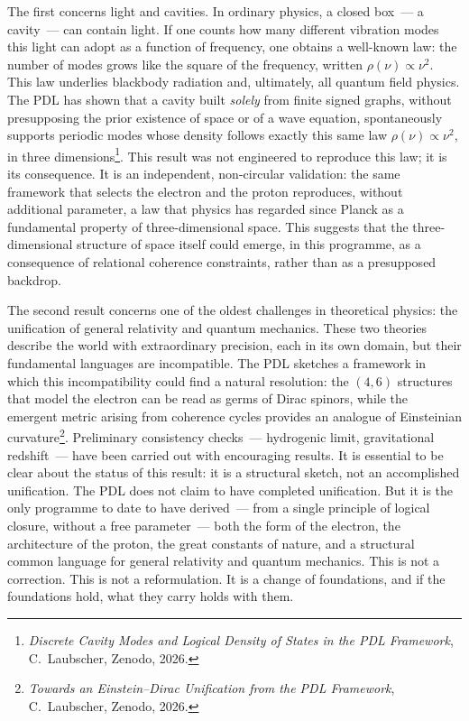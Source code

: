 \documentclass[12pt, a4paper, openright]{book}
\begin{document}
The first concerns light and cavities. In ordinary physics, a closed box~--- a cavity~--- can contain light. If one counts how many different vibration modes this light can adopt as a function of frequency, one obtains a well-known law: the number of modes grows like the square of the frequency, written $\rho(\nu) \propto \nu^2$. This law underlies blackbody radiation and, ultimately, all quantum field physics. The PDL has shown that a cavity built \emph{solely} from finite signed graphs, without presupposing the prior existence of space or of a wave equation, spontaneously supports periodic modes whose density follows exactly this same law $\rho(\nu) \propto \nu^2$, in three dimensions\footnote{\textit{Discrete Cavity Modes and Logical Density of States in the PDL Framework}, C.~Laubscher, Zenodo, 2026.}. This result was not engineered to reproduce this law; it is its consequence. It is an independent, non-circular validation: the same framework that selects the electron and the proton reproduces, without additional parameter, a law that physics has regarded since Planck as a fundamental property of three-dimensional space. This suggests that the three-dimensional structure of space itself could emerge, in this programme, as a consequence of relational coherence constraints, rather than as a presupposed backdrop.

\medskip

The second result concerns one of the oldest challenges in theoretical physics: the unification of general relativity and quantum mechanics. These two theories describe the world with extraordinary precision, each in its own domain, but their fundamental languages are incompatible. The PDL sketches a framework in which this incompatibility could find a natural resolution: the $(4,6)$ structures that model the electron can be read as germs of Dirac spinors, while the emergent metric arising from coherence cycles provides an analogue of Einsteinian curvature\footnote{\textit{Towards an Einstein--Dirac Unification from the PDL Framework}, C.~Laubscher, Zenodo, 2026.}. Preliminary consistency checks~--- hydrogenic limit, gravitational redshift~--- have been carried out with encouraging results. It is essential to be clear about the status of this result: it is a structural sketch, not an accomplished unification. The PDL does not claim to have completed unification. But it is the only programme to date to have derived~--- from a single principle of logical closure, without a free parameter~--- both the form of the electron, the architecture of the proton, the great constants of nature, and a structural common language for general relativity and quantum mechanics. This is not a correction. This is not a reformulation. It is a change of foundations, and if the foundations hold, what they carry holds with them.
\end{document}
